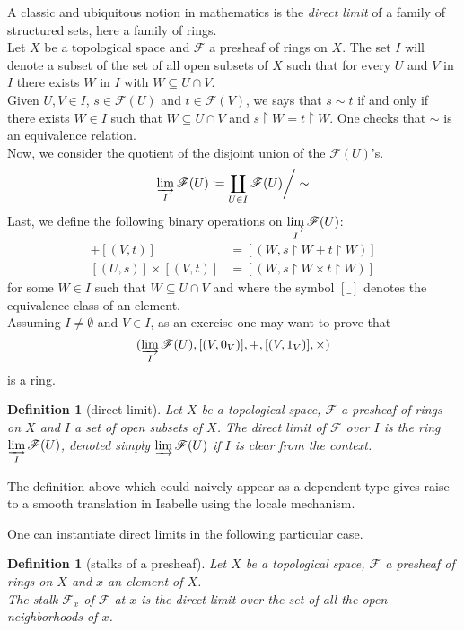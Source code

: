 \documentclass[12pt]{scrartcl}
\newtheorem{definition}[proposition]{Definition}
\begin{document}
A classic and ubiquitous notion in mathematics is the \emph{direct limit} of a family of structured sets, here a family of rings. \\
Let $X$ be a topological space and $\mathscr{F}$ a presheaf of rings on $X$. The set $I$ will denote a subset of the set of all open subsets of $X$ such that for every $U$ and $V$ in $I$ there exists $W$ in $I$ with $W \subseteq U \cap V$. \\
Given $U, V \in I$, $s \in \mathscr{F}(U)$ and $t \in \mathscr{F}(V)$,  we says that 
$s \sim t$ if and only if there exists $W \in I$ such that $W \subseteq U \cap V$ and $s \restriction W = t \restriction W$. One checks that $\sim$ is an equivalence relation. \\
Now, we consider the quotient of the disjoint union of the $\mathscr{F}(U)$'s.
	\[
	\varinjlim_I \mathscr{F}(U) \coloneqq \coprod_{U \in I} \mathscr{F}(U) \bigg/ \sim 
	\]
Last, we define the following binary operations on $\displaystyle \varinjlim_{I} \mathscr{F}(U)$:
	\begin{align*}
	[(U, s)] + [(V, t)] & = [(W, s \restriction W + t \restriction W)] \\
	[(U, s)] \times [(V, t)] & = [(W, s \restriction W \times t \restriction W)]
	\end{align*}
for some $W \in I$ such that $W \subseteq U \cap V$ and where the symbol $[\_]$ denotes the equivalence class of an element. \\
Assuming $I \neq \emptyset$ and $V \in I$, as an exercise one may want to prove that  
	\[
	(\varinjlim_I \mathscr{F}(U), [(V, 0_V)], +, [(V, 1_V)], \times)
	\]
is a ring. 

\begin{definition}[direct limit]
	Let $X$ be a topological space, $\mathscr{F}$ a presheaf of rings on $X$ and $I$ a set of open subsets of $X$. The direct limit of $\mathscr{F}$ over $I$ is the ring $\displaystyle \varinjlim_I \mathscr{F}(U)$, denoted simply $\varinjlim \mathscr{F}(U)$ if $I$ is clear from the context.
\end{definition}

The definition above which could naively appear as a dependent type gives raise to a smooth translation in Isabelle using the locale mechanism.


One can instantiate direct limits in the following particular case.

\begin{definition}[stalks of a presheaf]
	Let $X$ be a topological space, $\mathscr{F}$ a presheaf of rings on $X$ and $x$ an element of $X$. \\
	The stalk $\mathscr{F}_x$ of $\mathscr{F}$ at $x$ is the direct limit over the set of all the open neighborhoods of $x$.   
\end{definition}
\end{document}
